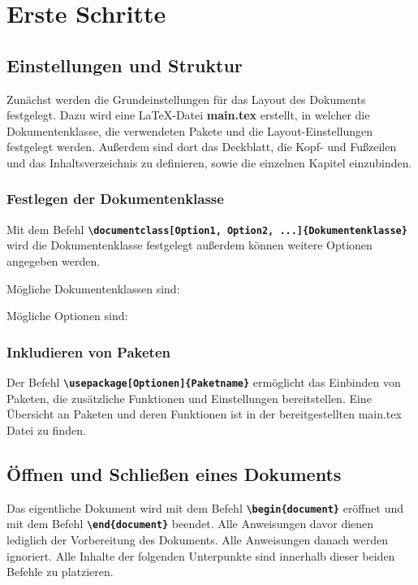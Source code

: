 \section{Erste Schritte}
\subsection{Einstellungen und Struktur}

Zunächst werden die Grundeinstellungen für das Layout des Dokuments festgelegt. Dazu wird eine \LaTeX{}-Datei \textbf{main.tex} erstellt, in welcher die Dokumentenklasse, die verwendeten Pakete und die Layout-Einstellungen festgelegt werden. Außerdem sind dort das Deckblatt, die Kopf- und Fußzeilen und das Inhaltsverzeichnis zu definieren, sowie die einzelnen Kapitel einzubinden.

\subsubsection{Festlegen der Dokumentenklasse}
Mit dem Befehl \textbf{\texttt{\textbackslash documentclass[Option1, Option2, ...]\{Dokumentenklasse\}}} wird die Dokumentenklasse festgelegt außerdem können weitere Optionen angegeben werden.

Mögliche Dokumentenklassen sind:


Mögliche Optionen sind:



\subsubsection{Inkludieren von Paketen}
Der Befehl \textbf{\texttt{\textbackslash usepackage[Optionen]\{Paketname\}}} ermöglicht das Einbinden von Paketen, die zusätzliche Funktionen und Einstellungen bereitstellen.
Eine Übersicht an Paketen und deren Funktionen ist in der bereitgestellten main.tex Datei zu finden.

\subsection{Öffnen und Schließen eines Dokuments}
Das eigentliche Dokument wird mit dem Befehl \textbf{\texttt{\textbackslash begin\{document\}}} eröffnet und mit dem Befehl \textbf{\texttt{\textbackslash end\{document\}}} beendet.
Alle Anweisungen davor dienen lediglich der Vorbereitung des Dokuments. Alle Anweisungen danach werden ignoriert. Alle Inhalte der folgenden Unterpunkte sind innerhalb dieser beiden Befehle zu platzieren.

